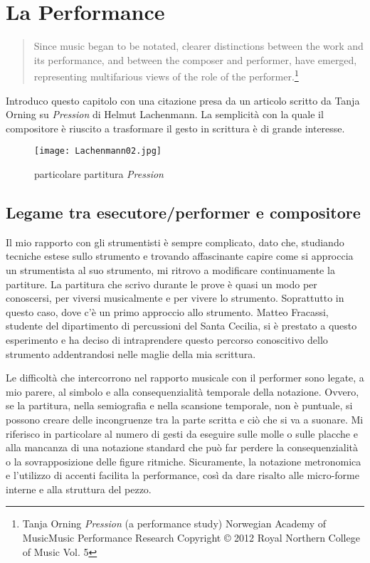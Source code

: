 
\chapter{La Performance}
\label{chp:La Performance}

\begin{quotation}
Since music began to be notated, clearer distinctions between the work and its performance, and between the composer and performer, have emerged, representing multifarious views of the role of the performer.\footnote{Tanja Orning \textit{Pression} (a performance study) Norwegian Academy of MusicMusic Performance Research Copyright © 2012 Royal Northern College of Music Vol. 5}
\end{quotation}

Introduco questo capitolo con una citazione presa da un articolo scritto da Tanja Orning su \textit{Pression} di Helmut Lachenmann. La semplicità con la quale il compositore è riuscito a trasformare il gesto in scrittura è di grande interesse. \begin{wrapfigure}{r}{5cm}
\centering
\texttt{[image: Lachenmann02.jpg]}
\caption{particolare partitura \textit{Pression}}
\label{default}
\end{wrapfigure}


\section{Legame tra esecutore/performer e compositore}

Il mio rapporto con gli strumentisti è sempre complicato, dato che, studiando tecniche estese sullo strumento e trovando affascinante capire come si approccia un strumentista al suo strumento, mi ritrovo a modificare continuamente la partiture. La partitura che scrivo durante le prove è quasi un modo per conoscersi, per viversi musicalmente e per vivere lo strumento. Soprattutto in questo caso, dove c'è un primo approccio allo strumento. Matteo Fracassi, studente del dipartimento di percussioni del Santa Cecilia, si è prestato a questo esperimento e ha deciso di intraprendere questo percorso conoscitivo dello strumento addentrandosi nelle maglie della mia scrittura.

 Le difficoltà che intercorrono nel rapporto musicale con il performer sono legate, a mio parere, al simbolo e alla consequenzialità temporale della notazione. Ovvero, se la partitura, nella semiografia e nella scansione temporale, non è puntuale, si possono creare delle incongruenze tra la parte scritta e ciò che si va a suonare. Mi riferisco in particolare al numero di gesti da eseguire sulle molle o sulle placche e alla mancanza di una notazione standard che può far perdere la consequenzialità o la sovrapposizione delle figure ritmiche. Sicuramente, la notazione metronomica e l'utilizzo di accenti facilita la performance, così da dare risalto alle micro-forme interne e alla struttura del pezzo.

